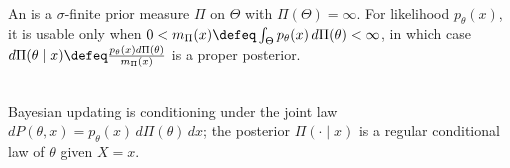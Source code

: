 \begin{definition} \label{rem:improper-priors-need-proper-posteriors} \\
An  is a $\sigma$-finite prior measure $\Pi$ on $\Theta$ with $\Pi(\Theta)=\infty$.
For likelihood $p_\theta(x)$, it is usable only when $0<m_\Pi(x)\defeq\int_\Theta p_\theta(x)\,d\Pi(\theta)<\infty$, in which case $d\Pi(\theta\mid x)\defeq\frac{p_\theta(x)d\Pi(\theta)}{m_\Pi(x)}$ is a proper posterior.
\end{definition}

\begin{remark} \label{rem:bayesian-conditioning-measure-theory} \\
Bayesian updating is conditioning under the joint law $dP(\theta,x)=p_\theta(x)\,d\Pi(\theta)\,dx$; the posterior $\Pi(\cdot\mid x)$ is a regular conditional law of $\theta$ given $X=x$.
\end{remark}
